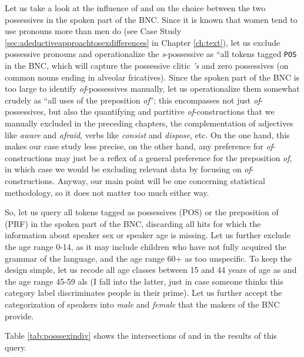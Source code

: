 Let us take a look at the influence of  and  on the choice between the two possessives in the spoken part of the BNC. Since it is known that women tend to use pronouns more than men do (see Case Study \ref{sec:adeductiveapproachtosexdifferences} in Chapter \ref{ch:text}), let us exclude possessive pronouns and operationalize the \textit{s}-possessive as ``all tokens tagged \texttt{POS} in the BNC, which will capture the possessive clitic \textit{'s} and zero possessives (on common nouns ending in alveolar fricatives). Since the spoken part of the BNC is too large to identify \textit{of}-possessives manually, let us operationalize them somewhat crudely as ``all uses of the preposition \textit{of}''; this encompasses not just \textit{of}-possessives, but also the quantifying and partitive \textit{of}-constructions that we manually excluded in the preceding chapters, the complementation of adjectives like \textit{aware} and \textit{afraid}, verbs like \textit{consist} and \textit{dispose}, etc. On the one hand, this makes our case study less precise, on the other hand, any preference for \textit{of}-constructions may just be a reflex of a general preference for the preposition \textit{of}, in which case we would be excluding relevant data by focusing on \textit{of}-constructions. Anyway, our main point will be one concerning statistical methodology, so it does not matter too much either way.

So, let us query all tokens tagged as possessives (POS) or the preposition of (PRF) in the spoken part of the BNC, discarding all hits for which the information about speaker sex or speaker age is missing. Let us further exclude the age range 0-14, as it may include children who have not fully acquired the grammar of the language, and the age range 60+ as too unspecific. To keep the design simple, let us recode all age classes between 15 and 44 years of age as  and the age range 45-59 als  (I fall into the latter, just in case someone thinks this category label discriminates people in their prime). Let us further accept the categorization of speakers into \textit{male} and \textit{female} that the makers of the BNC provide.

Table \ref{tab:posssexindiv} shows the intersections of  and  in the results of this query. 

